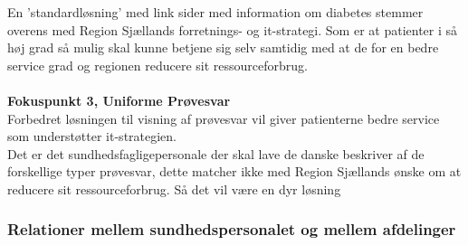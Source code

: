 En 'standardløsning' med link sider med information om diabetes stemmer overens med Region Sjællands forretnings- og it-strategi. 
Som er at patienter i så høj grad så mulig skal kunne betjene sig selv samtidig med at de for en bedre service grad og regionen reducere sit ressourceforbrug.
\\\\
%
\textbf{Fokuspunkt 3, Uniforme Prøvesvar}\\
Forbedret løsningen til visning af prøvesvar vil giver patienterne bedre service som understøtter it-strategien.\\
Det er det sundhedsfagligepersonale der skal lave de danske beskriver af de forskellige typer prøvesvar, dette matcher ikke med Region Sjællands ønske om at reducere sit ressourceforbrug. Så det vil være en dyr løsning\\
%
\subsubsection{Relationer mellem sundhedspersonalet og mellem afdelinger}